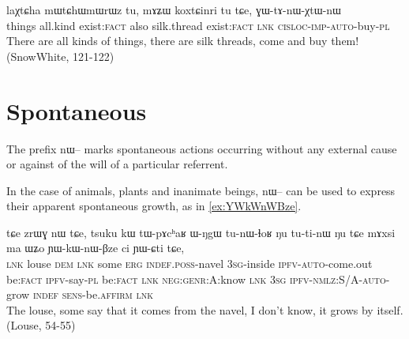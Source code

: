 \documentclass[oldfontcommands,oneside,a4paper,11pt]{article}
\newcommand{\ipa}[1]{{\phon \mbox{#1}}} %
\begin{document}
\begin{exe}
\ex \label{ex:GWtAnWXtWnW}
\gll
\ipa{laχtɕha} 	\ipa{mɯtɕhɯmɯrɯz} 	\ipa{tu,} 	\ipa{mɤʑɯ} 	\ipa{koxtɕinri} 	\ipa{tu} 	\ipa{tɕe,} 	\ipa{ɣɯ-tɤ-nɯ-χtɯ-nɯ} \\ 
things all.kind exist:\textsc{fact} also silk.thread exist:\textsc{fact} \textsc{lnk} \textsc{cisloc-imp-auto}-buy-\textsc{pl} \\
\glt There are all kinds of things, there are silk threads, come and buy them! (SnowWhite, 121-122)
\end{exe}


 
\section{Spontaneous}
The prefix \ipa{nɯ--} marks spontaneous actions  occurring without any external cause or against of the will of a particular referrent.

In the case of animals, plants and inanimate beings, \ipa{nɯ--} can be used to express  their apparent spontaneous growth, as in \ref{ex:YWkWnWBze}.
\begin{exe}
\ex \label{ex:YWkWnWBze}
\gll 
\ipa{tɕe} 	\ipa{zrɯɣ} 	\ipa{nɯ} 	\ipa{tɕe,} 	\ipa{tsuku} 	\ipa{kɯ} 	\ipa{tɯ-pɤcʰaʁ} 	\ipa{ɯ-ŋgɯ} 	\ipa{tu-nɯ-ɬoʁ} 	\ipa{ŋu} 	\ipa{tu-ti-nɯ} 	\ipa{ŋu} 	\ipa{tɕe} 	\ipa{mɤxsi} 	\ipa{ma} 	\ipa{ɯʑo} 	\ipa{ɲɯ-kɯ-nɯ-βze} 	\ipa{ci} 	\ipa{ɲɯ-ɕti} 	\ipa{tɕe,} 	\\
\textsc{lnk} louse \textsc{dem} \textsc{lnk} some \textsc{erg} \textsc{indef.poss}-navel \textsc{3sg}-inside \textsc{ipfv-auto}-come.out be:\textsc{fact} \textsc{ipfv}-say-\textsc{pl}  be:\textsc{fact} \textsc{lnk} \textsc{neg:genr:}A:know \textsc{lnk} \textsc{3sg} \textsc{ipfv-nmlz:S/A-auto}-grow \textsc{indef} \textsc{sens}-be.\textsc{affirm} \textsc{lnk} \\
\glt The louse, some say that it comes from the navel, I don't know, it grows by itself. (Louse, 54-55)
\end{exe}
\end{document}
